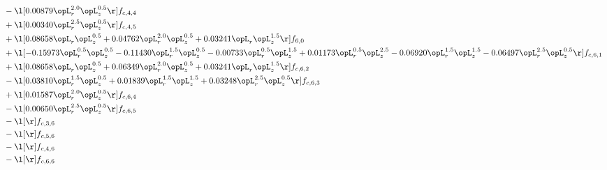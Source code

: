 \begin{alignat}{2}
& - \l[  0.00879 \opL_r^{2.0} \opL_z^{0.5}  \r] f_{c,4,4} \nonumber \\ 
& + \l[  0.00340 \opL_r^{2.5} \opL_z^{0.5}  \r] f_{c,4,5} \nonumber \\ 
& + \l[  0.08658 \opL_r \opL_z^{0.5} +  0.04762 \opL_r^{2.0} \opL_z^{0.5} +  0.03241 \opL_r \opL_z^{1.5}  \r] f_{6,0} \nonumber \\ 
& + \l[  -0.15973 \opL_r^{0.5} \opL_z^{0.5}   -0.11430 \opL_r^{1.5} \opL_z^{0.5}   -0.00733 \opL_r^{0.5} \opL_z^{1.5} +  0.01173 \opL_r^{0.5} \opL_z^{2.5}   -0.06920 \opL_r^{1.5} \opL_z^{1.5}   -0.06497 \opL_r^{2.5} \opL_z^{0.5}  \r] f_{c,6,1} \nonumber \\ 
& + \l[  0.08658 \opL_r \opL_z^{0.5} +  0.06349 \opL_r^{2.0} \opL_z^{0.5} +  0.03241 \opL_r \opL_z^{1.5}  \r] f_{c,6,2} \nonumber \\ 
& - \l[  0.03810 \opL_r^{1.5} \opL_z^{0.5} +  0.01839 \opL_r^{1.5} \opL_z^{1.5} +  0.03248 \opL_r^{2.5} \opL_z^{0.5}  \r] f_{c,6,3} \nonumber \\ 
& + \l[  0.01587 \opL_r^{2.0} \opL_z^{0.5}  \r] f_{c,6,4} \nonumber \\ 
& - \l[  0.00650 \opL_r^{2.5} \opL_z^{0.5}  \r] f_{c,6,5} \nonumber \\ 
& - \l[  \r] f_{c,3,6} \nonumber \\ 
& - \l[  \r] f_{c,5,6} \nonumber \\ 
& - \l[  \r] f_{c,4,6} \nonumber \\ 
& - \l[  \r] f_{c,6,6} \nonumber \\ 
\end{alignat} 


